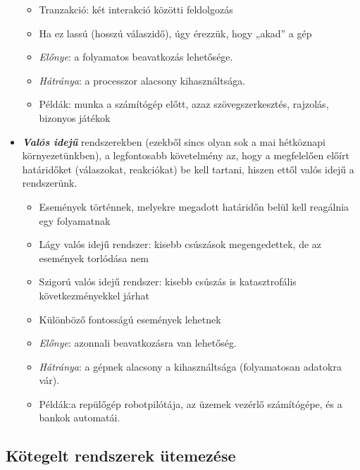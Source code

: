 \documentclass[tikz,12pt,margin=0px]{article}
\begin{document}
\begin{itemize}[topsep=8pt,itemsep=4pt,partopsep=4pt, parsep=4pt]
\begin{itemize}
\begin{itemize}
                \end{itemize}
                \item Tranzakció: két interakció közötti feldolgozás
                \item Ha ez lassú (hosszú válaszidő), úgy érezzük, hogy „akad” a gép
                \item \emph{Előnye}: a folyamatos beavatkozás lehetősége.
                \item \emph{Hátránya}: a processzor alacsony kihasználtsága.
                \item Példák: munka a számítógép előtt, azaz szövegszerkesztés, rajzolás, bizonyos játékok\\
            \end{itemize}

        \item \emph{\textbf{Valós idejű}} rendszerekben (ezekből sincs olyan sok a mai hétköznapi környezetünkben), a legfontosabb követelmény az, hogy a megfelelően előírt határidőket (válaszokat, reakciókat) be kell tartani, hiszen ettől valós idejű a rendszerünk.
            \begin{itemize}
                \item Események történnek, melyekre megadott határidőn belül kell reagálnia egy folyamatnak
                \item Lágy valós idejű rendszer: kisebb csúszások megengedettek, de az események torlódása nem
                \item  Szigorú valós idejű rendszer: kisebb csúszás is katasztrofális következményekkel járhat
                \item  Különböző fontosságú események lehetnek
                \item \emph{Előnye}: azonnali beavatkozásra van lehetőség.
                \item \emph{Hátránya}: a gépnek alacsony a kihasználtsága (folyamatosan adatokra vár).
                \item  Példák:a repülőgép robotpilótája, az üzemek vezérlő számítógépe, és a bankok automatái.\\
            \end{itemize}

    \end{itemize}

    \subsection*{Kötegelt rendszerek ütemezése}
\end{document}
